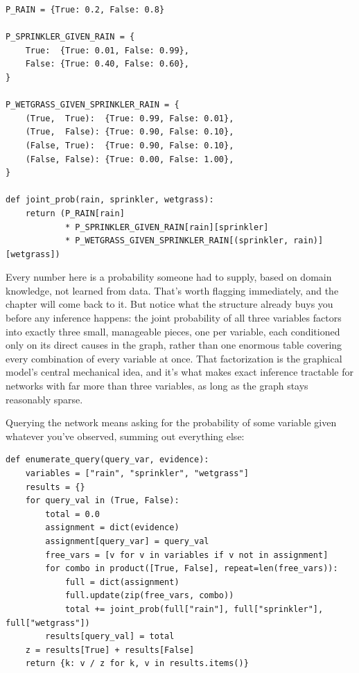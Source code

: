\begin{Verbatim}[fontsize=\small, frame=single, xleftmargin=1em, xrightmargin=1em]
P_RAIN = {True: 0.2, False: 0.8}

P_SPRINKLER_GIVEN_RAIN = {
    True:  {True: 0.01, False: 0.99},
    False: {True: 0.40, False: 0.60},
}

P_WETGRASS_GIVEN_SPRINKLER_RAIN = {
    (True,  True):  {True: 0.99, False: 0.01},
    (True,  False): {True: 0.90, False: 0.10},
    (False, True):  {True: 0.90, False: 0.10},
    (False, False): {True: 0.00, False: 1.00},
}

def joint_prob(rain, sprinkler, wetgrass):
    return (P_RAIN[rain]
            * P_SPRINKLER_GIVEN_RAIN[rain][sprinkler]
            * P_WETGRASS_GIVEN_SPRINKLER_RAIN[(sprinkler, rain)][wetgrass])
\end{Verbatim}

Every number here is a probability someone had to supply, based on domain knowledge, not learned from data. That's worth flagging immediately, and the chapter will come back to it. But notice what the structure already buys you before any inference happens: the joint probability of all three variables factors into exactly three small, manageable pieces, one per variable, each conditioned only on its direct causes in the graph, rather than one enormous table covering every combination of every variable at once. That factorization is the graphical model's central mechanical idea, and it's what makes exact inference tractable for networks with far more than three variables, as long as the graph stays reasonably sparse.

Querying the network means asking for the probability of some variable given whatever you've observed, summing out everything else:

\begin{Verbatim}[fontsize=\small, frame=single, xleftmargin=1em, xrightmargin=1em]
def enumerate_query(query_var, evidence):
    variables = ["rain", "sprinkler", "wetgrass"]
    results = {}
    for query_val in (True, False):
        total = 0.0
        assignment = dict(evidence)
        assignment[query_var] = query_val
        free_vars = [v for v in variables if v not in assignment]
        for combo in product([True, False], repeat=len(free_vars)):
            full = dict(assignment)
            full.update(zip(free_vars, combo))
            total += joint_prob(full["rain"], full["sprinkler"], full["wetgrass"])
        results[query_val] = total
    z = results[True] + results[False]
    return {k: v / z for k, v in results.items()}
\end{Verbatim}

